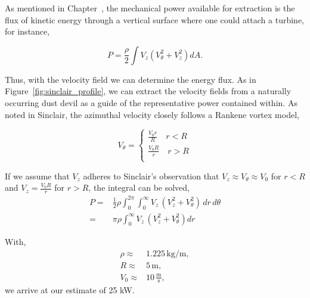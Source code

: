 \label{scaling}

As mentioned in Chapter~\label{sec:physics}, the mechanical power
available for extraction is the flux of kinetic energy through a
vertical surface where one could attach a turbine, for instance, 

\begin{equation}
 P = \frac{\rho }{2} \int V_z (V_{\theta}^2 + V_z^2 ) dA. 
\end{equation}

Thus, with the velocity field we can determine the energy
flux. As in Figure~\ref{fig:sinclair_profile}, we can extract the
velocity fields from a naturally occurring dust devil as a guide of the 
representative power contained within. As noted in Sinclair, the
azimuthal velocity closely follows a Rankene vortex model, 

\begin{equation}
 V_{\theta} = 
  \begin{cases}
   \frac{V_0 r}{R} \quad r < R \\
   \frac{V_0 R}{r} \quad r > R \\
  \end{cases}
\end{equation}

If we assume that $V_z$ adheres to Sinclair's observation that $V_z \approx
V_{\theta} \approx V_0$ for $r < R$ and $V_z=\frac{V_0 R}{r}$ for $r > R$,
the integral can be solved, 
\begin{eqnarray}
 P =& \frac{1}{2} \rho \int_0^{2\pi}\int_0^{\infty} V_z \, (V^2_z +
  V_{\theta}^2)\, dr \, d\theta \\ 
 =& \pi \rho \int_0^{\infty} V_z \, (V^2_z + V_{\theta}^2) dr
\end{eqnarray}

%
%

With, 
\begin{eqnarray}
 \rho \approx& 1.225 \,\text{kg}/\text{m}, \\
 R \approx& 5 \,\text{m}, \\
 V_0 \approx& 10 \,\frac{\text{m}}{\text{s}},
\end{eqnarray}
we arrive at our estimate of 25 kW.